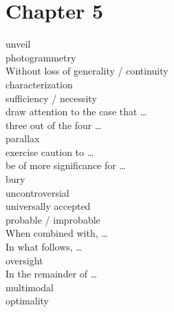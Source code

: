 \documentclass[12pt]{article}
\begin{document}
\section{Chapter 5}
unveil   \\
photogrammetry   \\
Without loss of generality / continuity   \\
characterization   \\
sufficiency / necessity  \\
draw attention to the case that \dots   \\
three out of the four \dots   \\
parallax   \\
exercise caution to \dots   \\
be of more significance for \dots   \\
bury   \\
uncontroversial   \\
universally accepted   \\
probable / improbable   \\
When combined with, \dots   \\
In what follows, \dots   \\
oversight   \\
In the remainder of \dots   \\
multimodal \\
optimality \\
\end{document}
